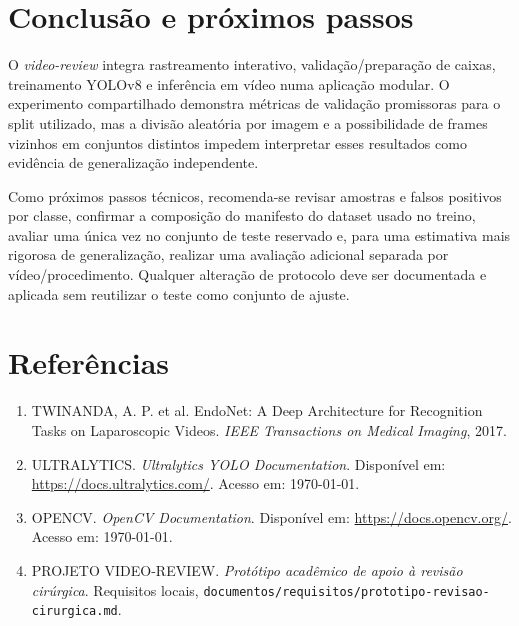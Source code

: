 \documentclass[12pt,a4paper]{article}
\begin{document}
\section{Conclusão e próximos passos}

O \textit{video-review} integra rastreamento interativo, validação/preparação de caixas, treinamento YOLOv8 e inferência em vídeo numa aplicação modular. O experimento compartilhado demonstra métricas de validação promissoras para o split utilizado, mas a divisão aleatória por imagem e a possibilidade de frames vizinhos em conjuntos distintos impedem interpretar esses resultados como evidência de generalização independente.

Como próximos passos técnicos, recomenda-se revisar amostras e falsos positivos por classe, confirmar a composição do manifesto do dataset usado no treino, avaliar uma única vez no conjunto de teste reservado e, para uma estimativa mais rigorosa de generalização, realizar uma avaliação adicional separada por vídeo/procedimento. Qualquer alteração de protocolo deve ser documentada e aplicada sem reutilizar o teste como conjunto de ajuste.

\section*{Referências}

\begin{enumerate}
  \item TWINANDA, A. P. et al. EndoNet: A Deep Architecture for Recognition Tasks on Laparoscopic Videos. \textit{IEEE Transactions on Medical Imaging}, 2017.
  \item ULTRALYTICS. \textit{Ultralytics YOLO Documentation}. Disponível em: \url{https://docs.ultralytics.com/}. Acesso em: \today.
  \item OPENCV. \textit{OpenCV Documentation}. Disponível em: \url{https://docs.opencv.org/}. Acesso em: \today.
  \item PROJETO VIDEO-REVIEW. \textit{Protótipo acadêmico de apoio à revisão cirúrgica}. Requisitos locais, \texttt{documentos/requisitos/prototipo-revisao-cirurgica.md}.
\end{enumerate}
\end{document}

